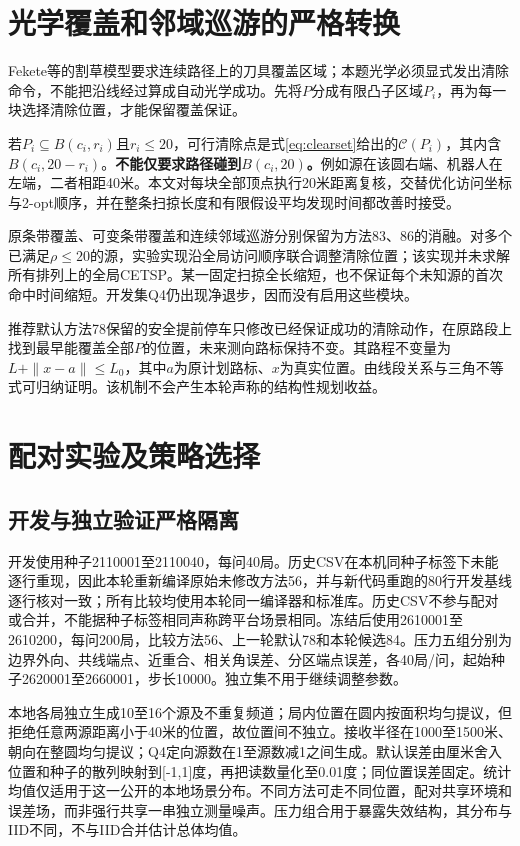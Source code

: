 \documentclass[UTF8,a4paper,zihao=-4,fontset=mac]{ctexart}
\begin{document}
\section{光学覆盖和邻域巡游的严格转换}
Fekete等\cite{lawn}的割草模型要求连续路径上的刀具覆盖区域；本题光学必须显式发出清除命令，不能把沿线经过算成自动光学成功。先将$P$分成有限凸子区域$P_i$，再为每一块选择清除位置，才能保留覆盖保证。

若$P_i\subseteq B(c_i,r_i)$且$r_i\le20$，可行清除点是式\eqref{eq:clearset}给出的$\mathcal C(P_i)$，其内含$B(c_i,20-r_i)$。\textbf{不能仅要求路径碰到$B(c_i,20)$。}例如源在该圆右端、机器人在左端，二者相距40米。本文对每块全部顶点执行20米距离复核，交替优化访问坐标与2-opt顺序，并在整条扫掠长度和有限假设平均发现时间都改善时接受。

原条带覆盖、可变条带覆盖和连续邻域巡游分别保留为方法83、86的消融。对多个已满足$\rho\le20$的源，实验实现沿全局访问顺序联合调整清除位置；该实现并未求解所有排列上的全局CETSP。某一固定扫掠全长缩短，也不保证每个未知源的首次命中时间缩短。开发集Q4仍出现净退步，因而没有启用这些模块。

推荐默认方法78保留的安全提前停车只修改已经保证成功的清除动作，在原路段上找到最早能覆盖全部$P$的位置，未来测向路标保持不变。其路程不变量为$L+\|x-a\|\le L_0$，其中$a$为原计划路标、$x$为真实位置。由线段关系与三角不等式可归纳证明。该机制不会产生本轮声称的结构性规划收益。

\section{配对实验及策略选择}
\subsection{开发与独立验证严格隔离}
开发使用种子2110001至2110040，每问40局。历史CSV在本机同种子标签下未能逐行重现，因此本轮重新编译原始未修改方法56，并与新代码重跑的80行开发基线逐行核对一致；所有比较均使用本轮同一编译器和标准库。历史CSV不参与配对或合并，不能据种子标签相同声称跨平台场景相同。冻结后使用2610001至2610200，每问200局，比较方法56、上一轮默认78和本轮候选84。压力五组分别为边界外向、共线端点、近重合、相关角误差、分区端点误差，各40局/问，起始种子2620001至2660001，步长10000。独立集不用于继续调整参数。

本地各局独立生成10至16个源及不重复频道；局内位置在圆内按面积均匀提议，但拒绝任意两源距离小于40米的位置，故位置间不独立。接收半径在1000至1500米、朝向在整圆均匀提议；Q4定向源数在1至源数减1之间生成。默认误差由厘米舍入位置和种子的散列映射到[-1,1]度，再把读数量化至0.01度；同位置误差固定。统计均值仅适用于这一公开的本地场景分布。不同方法可走不同位置，配对共享环境和误差场，而非强行共享一串独立测量噪声。压力组合用于暴露失效结构，其分布与IID不同，不与IID合并估计总体均值。
\end{document}
